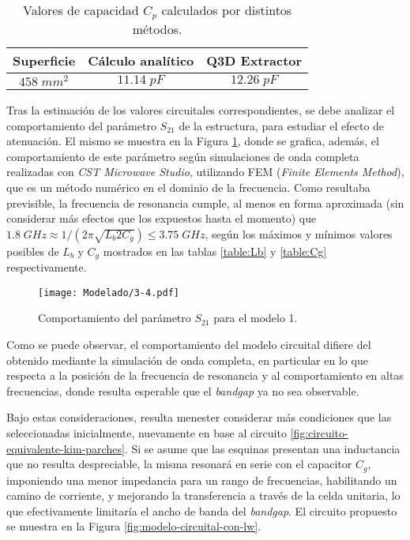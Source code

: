 \begin{table}
	\centering
	\begin{tabular}{|c|c|c|}
		\hline 
		Superficie & Cálculo analítico & Q3D Extractor\\ 
		\hline 
		$458\; mm^2$ & $11.14\;pF$ & $12.26\;pF$\\ 
		\hline 
	\end{tabular}
	\caption{Valores de capacidad $C_p$ calculados por distintos métodos.}
	\label{table:Cp-modelo1-circuital}
\end{table}

Tras la estimación de los valores circuitales correspondientes, se debe analizar el comportamiento del parámetro $S_{21}$ de la estructura, para estudiar el efecto de atenuación. El mismo se muestra en la Figura \ref{fig:s21-modelo1}, donde se grafica, además, el comportamiento de este parámetro según simulaciones de onda completa realizadas con \textit{CST Microwave Studio}, utilizando FEM (\textit{Finite Elements Method}), que es un método numérico en el dominio de la frecuencia. Como resultaba previsible, la frecuencia de resonancia cumple, al menos en forma aproximada (sin considerar más efectos que los expuestos hasta el momento) que $1.8\;GHz \approx 1/(2\pi\sqrt{L_{b} 2C_{g}}) \leq 3.75 \;GHz $, según los máximos y mínimos valores posibles de $L_b$ y $C_g$ mostrados en las tablas \ref{table:Lb} y \ref{table:Cg} respectivamente.

\begin{figure}[h]
	\centering
	\texttt{[image: Modelado/3-4.pdf]}
	\caption{Comportamiento del parámetro $S_{21}$ para el modelo 1.}
	\label{fig:s21-modelo1}
\end{figure}

Como se puede observar, el comportamiento del modelo circuital difiere del obtenido mediante la simulación de onda completa, en particular en lo que respecta a la posición de la frecuencia de resonancia y al comportamiento en altas frecuencias, donde resulta esperable que el \textit{bandgap} ya no sea observable.

Bajo estas consideraciones, resulta menester considerar más condiciones que las seleccionadas inicialmente, nuevamente en base al circuito \ref{fig:circuito-equivalente-kim-parches}. Si se asume que las esquinas presentan una inductancia que no resulta despreciable, la misma resonará en serie con el capacitor $C_g$, imponiendo una menor impedancia para un rango de frecuencias, habilitando un camino de corriente, y mejorando la transferencia a través de la celda unitaria, lo que efectivamente limitaría el ancho de banda del \textit{bandgap}. El circuito propuesto se muestra en la Figura \ref{fig:modelo-circuital-con-lw}. 

